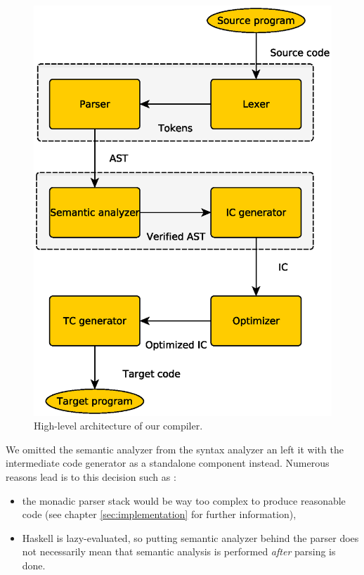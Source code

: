 \documentclass[titlepage]{article}
\begin{document}
\begin{figure}[h!]
	\centering
	\includegraphics[scale=0.5]{figures/compilerArchitecture}
	\caption{High-level architecture of our compiler.}
	\label{fig:architecture}
\end{figure}

We omitted the semantic analyzer from the syntax analyzer an left it with the intermediate
code generator as a standalone component instead. Numerous reasons lead is to this decision
such as :

\begin{itemize}
	\item the monadic parser stack would be way too complex to produce reasonable code
		(see chapter \ref{sec:implementation} for further information),
	\item Haskell is lazy-evaluated, so putting semantic analyzer behind the parser does
		not necessarily mean that semantic analysis is performed \textit{after}
		parsing is done.
\end{itemize}
\end{document}
